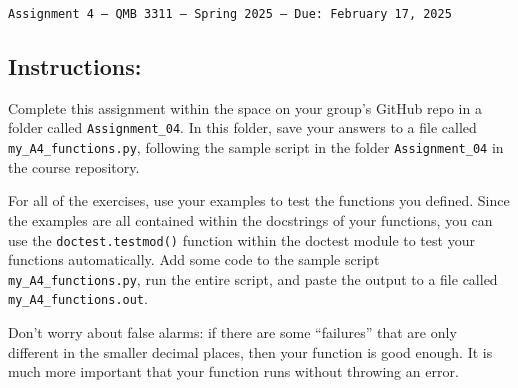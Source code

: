 \documentclass[11pt]{exam}
\begin{document}
\texttt{Assignment 4 --- QMB 3311 ---  Spring 2025  --- Due: February 17, 2025}

\subsection*{Instructions:}

Complete this assignment within the space on your group's GitHub repo in a folder called \texttt{Assignment\_04}. In this folder, save your answers to a file called \texttt{my\_A4\_functions.py}, following the sample script in the folder \texttt{Assignment\_04} in the course repository.

For all of the exercises, use your examples to test the functions you defined. Since the examples are all contained within the docstrings of your functions, you can use the
\texttt{doctest.testmod()} function within the doctest module to test your functions automatically. Add some code to the sample script \texttt{my\_A4\_functions.py}, run the entire script, and paste the output to a file called \texttt{my\_A4\_functions.out}.

Don't worry about false alarms: if there are some ``failures'' that are only different in the smaller decimal places, then your function is good enough. It is much more important that your function runs without throwing an error.
\end{document}
